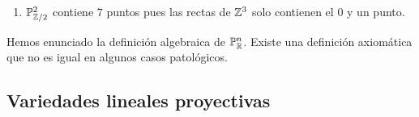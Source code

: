 \begin{example}
\begin{enumerate}
\begin{center}
		\end{center}
		
		\item $\mathbb{P}^2_{\mathbb{Z} / 2}$ contiene $7$ puntos pues las rectas de $\mathbb{Z}^3$ solo contienen el $0$ y un punto.
	\end{enumerate}
\end{example}
\begin{obs}
	Hemos enunciado la definición algebraica de $\mathbb{P}_{\mathbb{R}}^{n}$. Existe una definición axiomática que no 
	es igual en algunos casos patológicos.
\end{obs}

\subsection{Variedades lineales proyectivas}

